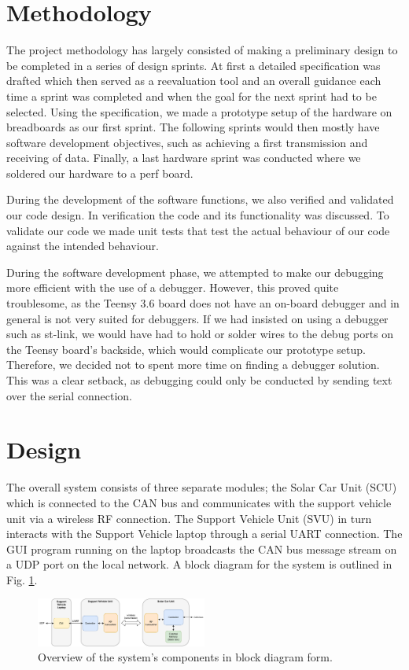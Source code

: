 \documentclass[conference]{IEEEtran}
\begin{document}
\section{Methodology}
The project methodology has largely consisted of making a preliminary design to be completed in a series of design sprints. At first a detailed specification was drafted which then served as a reevaluation tool and an overall guidance each time a sprint was completed and when the goal for the next sprint had to be selected. Using the specification, we made a prototype setup of the hardware on breadboards as our first sprint. The following sprints would then mostly have software development objectives, such as achieving a first transmission and receiving of data. Finally, a last hardware sprint was conducted where we soldered our hardware to a perf board.

During the development of the software functions, we also verified and validated our code design. In verification the code and its functionality was discussed. To validate our code we made unit tests that test the actual behaviour of our code against the intended behaviour.

During the software development phase, we attempted to make our debugging more efficient with the use of a debugger. However, this proved quite troublesome, as the Teensy 3.6 board does not have an on-board debugger and in general is not very suited for debuggers. If we had insisted on using a debugger such as st-link, we would have had to hold or solder wires to the debug ports on the Teensy board's backside, which would complicate our prototype setup. Therefore, we decided not to spent more time on finding a debugger solution. This was a clear setback, as debugging could only be conducted by sending text over the serial connection.

\section{Design}
The overall system consists of three separate modules; the Solar Car Unit (SCU) which is connected to the CAN bus and communicates with the support vehicle unit via a wireless RF connection. The Support Vehicle Unit (SVU) in turn interacts with the Support Vehicle laptop through a serial UART connection. The GUI program running on the laptop broadcasts the CAN bus message stream on a UDP port on the local network. A block diagram for the system is outlined in Fig. \ref{fig:schematic}. 
\begin{figure}[H]
    \centering
    \includegraphics[width=0.5\textwidth]{documentation/images/SystemSchematic.pdf}
    \caption{Overview of the system's components in block diagram form.}
    \label{fig:schematic}
\end{figure}
% 
\end{document}
